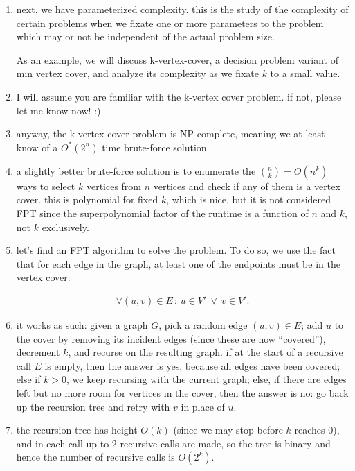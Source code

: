 \begin{enumerate}
  \item next, we have parameterized complexity. this is the study of the
    complexity of certain problems when we fixate one or more parameters to the
    problem which may or not be independent of the actual problem size.

    As an example, we will discuss k-vertex-cover, a decision problem variant of
    min vertex cover, and analyze its complexity as we fixate $k$ to a small
    value.

  \item I will assume you are familiar with the k-vertex cover problem. if not,
    please let me know now! :)

  \item anyway, the k-vertex cover problem is NP-complete, meaning we at least
    know of a $O^\ast(2^n)$ time brute-force solution.

  \item a slightly better brute-force solution is to enumerate the $\binom{n}{k}
    = O(n^k)$ ways to select $k$ vertices from $n$ vertices and check if any of
    them is a vertex cover. this is polynomial for fixed $k$, which is nice, but
    it is not considered FPT since the superpolynomial factor of the runtime is 
    a function of $n$ and $k$, not $k$ exclusively.

  \item let's find an FPT algorithm to solve the problem. To do so, we use the
    fact that for each edge in the graph, at least one of the endpoints must be
    in the vertex cover:

    \begin{align}
      \forall (u, v) \in E\, :\, u \in V' \  \lor \ v\in V'.
    \end{align}

  \item it works as such: given a graph $G$, pick a random edge $(u, v) \in E$;
    add $u$ to the cover by removing its incident edges (since these are now
    ``covered''), decrement $k$, and recurse on the resulting graph. if at the
    start of a recursive call $E$ is empty, then the answer is yes, because all
    edges have been covered; else if $k > 0$, we keep recursing with the current
    graph; else, if there are edges left but no more room for vertices in the
    cover, then the answer is no: go back up the recursion tree and retry with
    $v$ in place of $u$.

  \item the recursion tree has height $O(k)$ (since we may stop before $k$
    reaches 0), and in each call up to 2 recursive calls are made, so the tree
    is binary and hence the number of recursive calls is $O(2^k)$.


\end{enumerate}
